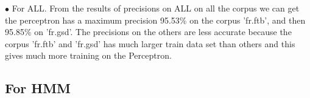 \documentclass{article}
\begin{document}
$\bullet$ For ALL. From the results of precisions on ALL on all the corpus we can get the perceptron has a maximum precision 95.53\% on the corpus 'fr.ftb', and then 95.85\% on 'fr.gsd'. The precisions on the others are less accurate because the corpus 'fr.ftb' and 'fr.gsd' has much larger train data set than others and this gives much more training on the Perceptron.

\subsection{For HMM}

 
% 

\end{document}
